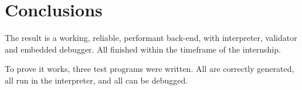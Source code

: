 \section{Conclusions}\label{conclusions}
The result is a working, reliable, performant back-end, with interpreter, validator and embedded debugger.
All finished within the timeframe of the internship.

To prove it works, three test programs were written.
All are correctly generated, all run in the interpreter, and all can be debugged.

